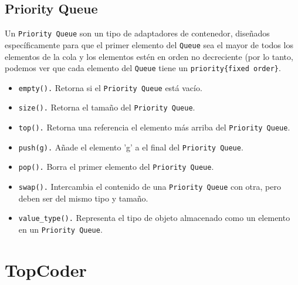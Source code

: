 \documentclass[a4paper,12pt]{article}
\begin{document}
\subsection*{Priority Queue}
Un \texttt{Priority Queue} son un tipo de adaptadores de contenedor, diseñados específicamente para que el primer elemento del \texttt{Queue} sea el mayor de todos los elementos de la cola y los elementos estén en orden no decreciente (por lo tanto, podemos ver que cada elemento del \texttt{Queue} tiene un \texttt{priority\{fixed order\}}.
\begin{itemize}
\item \texttt{empty().} Retorna si el \texttt{Priority Queue} está vacío.
\item \texttt{size().} Retorna el tamaño del \texttt{Priority Queue}.
\item \texttt{top().} Retorna una referencia el elemento más arriba del \texttt{Priority Queue}.
\item \texttt{push(g).} Añade el elemento 'g' a el final del \texttt{Priority Queue}.
\item \texttt{pop().} Borra el primer elemento del \texttt{Priority Queue}.
\item \texttt{swap().} Intercambia el contenido de una \texttt{Priority Queue} con otra, pero deben ser del mismo tipo y tamaño.
\item \texttt{value\_type().} Representa el tipo de objeto almacenado como un elemento en un \texttt{Priority Queue}.
\end{itemize}
\section{TopCoder}
\end{document}
